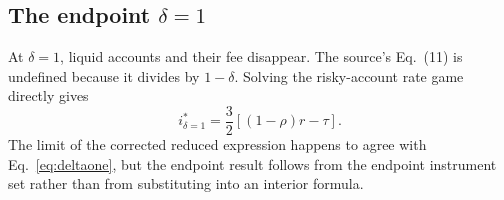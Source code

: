 \subsection{The endpoint $\delta=1$}
At $\delta=1$, liquid accounts and their fee disappear. The source's Eq.~(11) is undefined because it divides by $1-\delta$. Solving the risky-account rate game directly gives
\begin{equation}\label{eq:deltaone}
\boxed{i^*_{\delta=1}=\frac32\left[(1-\rho)r-\tau\right].}
\end{equation}
The limit of the corrected reduced expression happens to agree with Eq.~\eqref{eq:deltaone}, but the endpoint result follows from the endpoint instrument set rather than from substituting into an interior formula.
